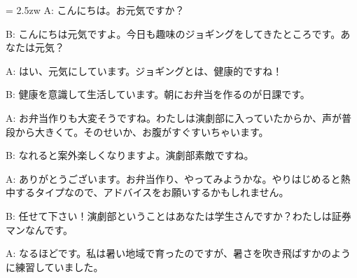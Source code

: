 \documentclass[11pt]{amsart}
\title{}
\author{}
\newenvironment{hangall}[1]{\hangindent = 2.5zw\everypar{\hangindent = 2.5zw}}{}
\begin{document}
\maketitle
\begin{hangall}{}%
A: こんにちは。お元気ですか？



B: こんにちは元気ですよ。今日も趣味のジョギングをしてきたところです。あなたは元気？



A: はい、元気にしています。ジョギングとは、健康的ですね！



B: 健康を意識して生活しています。朝にお弁当を作るのが日課です。



A: お弁当作りも大変そうですね。わたしは演劇部に入っていたからか、声が普段から大きくて。そのせいか、お腹がすぐすいちゃいます。



B: なれると案外楽しくなりますよ。演劇部素敵ですね。



A: ありがとうございます。お弁当作り、やってみようかな。やりはじめると熱中するタイプなので、アドバイスをお願いするかもしれません。



B: 任せて下さい！演劇部ということはあなたは学生さんですか？わたしは証券マンなんです。



A: なるほどです。私は暑い地域で育ったのですが、暑さを吹き飛ばすかのように練習していました。\end{hangall}
\end{document}

